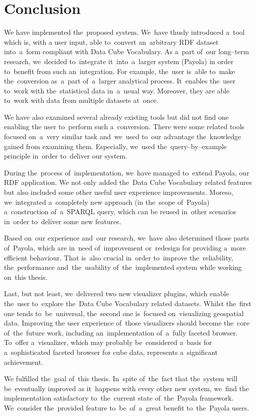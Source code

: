 \chapter*{Conclusion}

We have implemented the~proposed system. We~have thusly introduced a~tool which is, with
a user input, able to~convert an~arbitrary RDF dataset into~a~form compliant with Data Cube Vocabulary.
As a~part of~our long--term research, we~decided to~integrate it~into~a~larger system (Payola)
in order to~benefit from such an~integration.
For example, the~user is~able to~make the~conversion as~a~part of~a~larger 
analytical process. It~enables the~user to~work with the~statistical data in~a~usual way. Moreover, they are able to~work with data from multiple datasets at~once.

We have also examined several already existing tools but did not find one enabling
the user to~perform such a~conversion. There were some related tools 
focused on~a~very similar task and~we~used to~our advantage the~knowledge gained from
examining them. Especially, we~used the~query--by--example principle in~order to~deliver our system.

During the~process of~implementation, we~have managed to~extend Payola, our RDF application. 
We not only added the~Data Cube Vocabulary related features but also included some 
other useful user experience improvements. Moreso, we~integrated a~completely 
new approach (in the~scope of~Payola) a~construction of~a~SPARQL query, which can 
be reused in~other scenarios in~order to~deliver some new features.

Based on~our experience and~our research, we~have also determined those parts of~Payola, which are in~need of~improvement or~redesign for providing a~more 
efficient behaviour. That is~also crucial in~order to~improve the~reliability, 
the~performance and~the~usability of~the~implemented system while working on~this 
thesis.

Last, but not least, we~delivered two new visualizer plugins, which enable the~user to~explore the~Data Cube Vocabulary related datasets. Whilst the~first one tends to~be~universal, the~second one is~focused on~visualizing geospatial data. Improving 
the user experience of~those visualizers should become the~core of~the~future work, 
including an~implementation of~a~fully faceted browser. To~offer a~visualizer,
which may probably be~considered a~basis for a~sophisticated faceted browser for cube data,
represents a~significant achievement.

We fulfilled the~goal of~this thesis. In~spite of~the~fact that the~system will be~eventually improved
as it~happens with every other new system, we~find
the implementation satisfactory to~the~current state of~the~Payola framework. We~consider the~provided feature to~be~of~a~great benefit to~the~Payola users.
